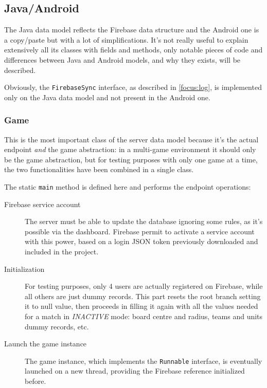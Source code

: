 		\subsection{Java/Android}
			
			The Java data model reflects the Firebase data structure and the Android one is a copy/paste but with a lot of simplifications. It's not really useful to explain extensively all its classes with fields and methods, only notable pieces of code and differences between Java and Android models, and why they exists, will be described.
			
			Obviously, the \lstinline|FirebaseSync| interface, as described in \autoref{focus:log}, is implemented only on the Java data model and not present in the Android one.
			
			\subsubsection{Game}
		
				This is the most important class of the server data model because it's the actual endpoint \emph{and} the game abstraction: in a multi-game environment it should only be the game abstraction, but for testing purposes with only one game at a time, the two functionalities have been combined in a single class.
				
				The static \lstinline|main| method is defined here and performs the endpoint operations:
				\begin{description}
					\item[Firebase service account] The server must be able to update the database ignoring some rules, as it's possible via the dashboard. Firebase permit to activate a service account with this power, based on a login JSON token previously downloaded and included in the project.
					\item[Initialization] For testing purposes, only 4 users are actually registered on Firebase, while all others are just dummy records. This part resets the root branch setting it to null value, then proceeds in filling it again with all the values needed for a match in \emph{INACTIVE} mode: board centre and radius, teams and units dummy records, etc.
					\item[Launch the game instance] The game instance, which implements the \lstinline|Runnable| interface, is eventually launched on a new thread, providing the Firebase reference initialized before.
				\end{description}
				
